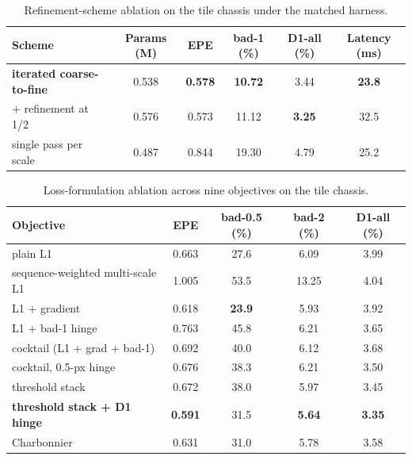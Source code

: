 \begin{table}[!htbp]
\centering
\caption{Refinement-scheme ablation on the tile chassis under the matched harness.}
\label{tab:ablation_refinement}
\small
\begin{tabular}{lccccc}
\toprule
Scheme & Params (M) & EPE & bad-1 (\%) & D1-all (\%) & Latency (ms)\\
\midrule
\textbf{iterated coarse-to-fine} & 0.538 & \textbf{0.578} & \textbf{10.72} & 3.44 & \textbf{23.8}\\
+ refinement at 1/2 & 0.576 & 0.573 & 11.12 & \textbf{3.25} & 32.5\\
single pass per scale & 0.487 & 0.844 & 19.30 & 4.79 & 25.2\\
\bottomrule
\end{tabular}
\end{table}

\vspace{-0.5cm}
\begin{table}[H]
\centering
\caption{Loss-formulation ablation across nine objectives on the tile chassis.}
\label{tab:ablation_loss}
\small
\begin{tabular}{lcccc}
\toprule
Objective & EPE & bad-0.5 (\%) & bad-2 (\%) & D1-all (\%)\\
\midrule
plain L1 & 0.663 & 27.6 & 6.09 & 3.99\\
sequence-weighted multi-scale L1 & 1.005 & 53.5 & 13.25 & 4.04\\
L1 + gradient & 0.618 & \textbf{23.9} & 5.93 & 3.92\\
L1 + bad-1 hinge & 0.763 & 45.8 & 6.21 & 3.65\\
cocktail (L1 + grad + bad-1) & 0.692 & 40.0 & 6.12 & 3.68\\
cocktail, 0.5-px hinge & 0.676 & 38.3 & 6.21 & 3.50\\
threshold stack & 0.672 & 38.0 & 5.97 & 3.45\\
\textbf{threshold stack + D1 hinge} & \textbf{0.591} & 31.5 & \textbf{5.64} & \textbf{3.35}\\
Charbonnier & 0.631 & 31.0 & 5.78 & 3.58\\
\bottomrule
\end{tabular}
\end{table}

\FloatBarrier
